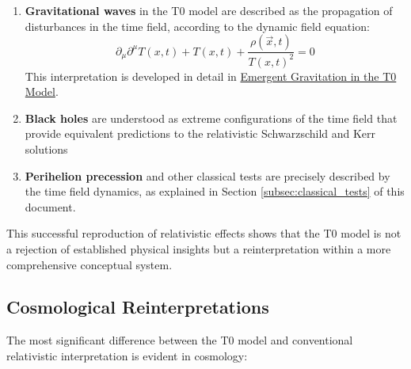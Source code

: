 \documentclass[12pt,a4paper]{article}
\newcommand{\Tfieldt}{T(x,t)}
\newcommand{\vecx}{\vec{x}}
\begin{document}
	\begin{enumerate}
		\item \textbf{Gravitational waves} in the T0 model are described as the propagation of disturbances in the time field, according to the dynamic field equation:
		\begin{equation}
			\partial_{\mu}\partial^{\mu}\Tfieldt + \Tfieldt + \frac{\rho(\vecx,t)}{\Tfieldt^2} = 0
		\end{equation}
		This interpretation is developed in detail in \href{https://github.com/jpascher/T0-Time-Mass-Duality/tree/main/2/pdf/English/EmergentGravT0En.pdf}{Emergent Gravitation in the T0 Model}.
		
		\item \textbf{Black holes} are understood as extreme configurations of the time field that provide equivalent predictions to the relativistic Schwarzschild and Kerr solutions
		
		\item \textbf{Perihelion precession} and other classical tests are precisely described by the time field dynamics, as explained in Section \ref{subsec:classical_tests} of this document.
	\end{enumerate}
	
	This successful reproduction of relativistic effects shows that the T0 model is not a rejection of established physical insights but a reinterpretation within a more comprehensive conceptual system.
	
	\subsection{Cosmological Reinterpretations}
	\label{subsec:cosmological_reinterpretation}
	
	The most significant difference between the T0 model and conventional relativistic interpretation is evident in cosmology:
	
\end{document}
